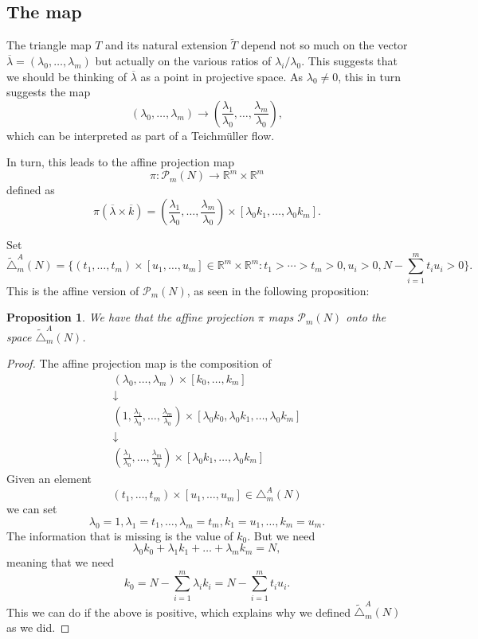 \documentclass[12pt,oneside,openany]{article}
\newtheorem{prop}[theorem]{Proposition}
\def\R{{\mathbb R}} %
\begin{document}
\subsection{The map}

The triangle map $T$ and its natural extension $\tilde{T}$ depend not so much on the  vector $\overline{\lambda} = (\lambda_0, \ldots, \lambda_m)$ but actually on the various ratios of  $\lambda_i/\lambda_0.$ 
This suggests that we should be thinking of $\overline{\lambda} $ as a point in projective space.  As $\lambda_0\neq 0$, this in turn suggests the map
$$(\lambda_0, \ldots, \lambda_m) \rightarrow  \left(\frac{\lambda_1}{\lambda_0}, \ldots,  \frac{\lambda_m}{\lambda_0} \right),$$
which can be interpreted as part of a Teichm\"{u}ller flow.

In turn, this leads to the affine projection map
$$\pi:\mathcal{P}_m (N) \rightarrow \R^m \times \R^m$$
defined as
$$\pi (\overline{\lambda} \times \overline{k}) 
=\left( \frac{\lambda_1}{\lambda_0}, \ldots,  \frac{\lambda_m}{\lambda_0} \right) \times \left[  \lambda_0 k_1, \ldots, \lambda_0 k_m\right].$$


Set 
$$ \tilde{\triangle}_m^A(N) = \{ (t_1, \ldots, t_m)\times [u_1, \ldots, u_m]\in \R^m\times \R^m: t_1 > \cdots > t_m>0, u_i>0,  N- \sum_{i=1}^m t_i u_i >0\}.$$
This is the affine version of $\mathcal{P}_m(N)$, as seen in the following proposition:

\begin{prop} We have that the affine projection $\pi$ maps $\mathcal{P}_m (N) $ onto the space $ \tilde{\triangle}_m^A(N) $.
\end{prop}


\begin{proof} 

The affine projection map is the composition of 
$$\begin{matrix}
(\lambda_0, \ldots, \lambda_m) \times [k_0, \ldots, k_m]\\
\downarrow\\
 \left( 1, \frac{\lambda_1}{\lambda_0}, \ldots,  \frac{\lambda_m}{\lambda_0} \right) \times \left[ \lambda_0 k_0, \lambda_0 k_1, \ldots, \lambda_0 k_m\right]\\
 \downarrow \\
 \left( \frac{\lambda_1}{\lambda_0}, \ldots,  \frac{\lambda_m}{\lambda_0} \right) \times \left[  \lambda_0 k_1, \ldots, \lambda_0 k_m\right]
\end{matrix}$$
Given an element $$(t_1, \ldots, t_m)\times [u_1, \ldots, u_m] \in \triangle_m^A(N)$$
we can set 
$$\lambda_0=1, \lambda_1=t_1, \ldots, \lambda_m=t_m, k_1=u_1,\ldots, k_m= u_m.$$
The information that is missing is the value of $k_0$.  But we need
$$\lambda_0 k_0 + \lambda_1k_1 + \ldots + \lambda_mk_m = N,$$
meaning that we need
$$k_0 = N - \sum_{i=1}^m \lambda_i k_i  = N - \sum_{i=1}^m t_i u_i . $$
This we can do if the above is positive, which explains why we defined $ \tilde{\triangle}_m^A(N) $ as we did.
 \end{proof}
\end{document}
